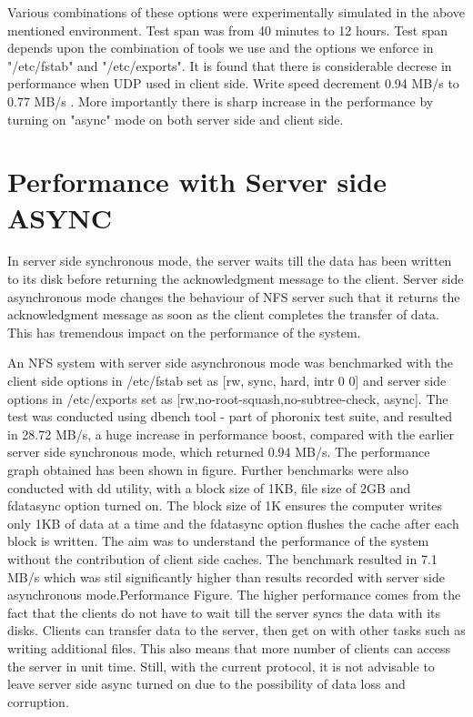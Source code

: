 \documentclass[conference]{IEEEtran}
\begin{document}
Various combinations of these options were experimentally simulated in the 
above mentioned environment. Test span was  from 40 minutes to 12 hours. 
Test span depends upon the combination of tools we use and the options we 
enforce in "/etc/fstab" and "/etc/exports". It is found that there is 
considerable decrese in performance when UDP used in client side. Write speed 
decrement 0.94 MB/s to 0.77 MB/s . More importantly there is sharp increase 
in the performance by turning on "async" mode on both server side and client 
side.


\section{Performance with Server side ASYNC}
In server side synchronous mode, the server waits till the data has been 
written to its disk before returning the acknowledgment message to the 
client. Server side asynchronous mode changes the behaviour of NFS server 
such that it returns the acknowledgment message as soon as the client 
completes the transfer of data. This has tremendous impact on the
performance of the system.

An NFS system with server side asynchronous mode was benchmarked with the
client side options in /etc/fstab set as [rw, sync, hard, intr 0 0] and
server side options in /etc/exports set as 
[rw,no-root-squash,no-subtree-check, async]. The test was conducted using
dbench tool - part of phoronix test suite, and resulted in 28.72 MB/s, a
huge increase in performance boost, compared with the earlier server side
synchronous mode, which returned 0.94 MB/s. The performance graph obtained has been shown in figure.
Further benchmarks were also conducted with dd utility, with a block size
of 1KB, file size of 2GB and fdatasync option turned on. The block size of
1K ensures the computer writes only 1KB of data at a time and the fdatasync
option flushes the cache after each block is written. The aim was to
understand the performance of the system without the contribution of client
side caches. The benchmark resulted in 7.1 MB/s which was stil significantly
higher than results recorded with server side asynchronous mode.Performance Figure.
The higher performance comes from the fact that the clients do not have to 
wait till the server syncs the data with its disks. Clients can transfer
data to the server, then get on with other tasks such as writing additional
files. This also means that more number of clients can access the server
in unit time. Still, with the current protocol, it is not advisable to leave
server side async turned on due to the possibility of data loss and
corruption.
\end{document}
